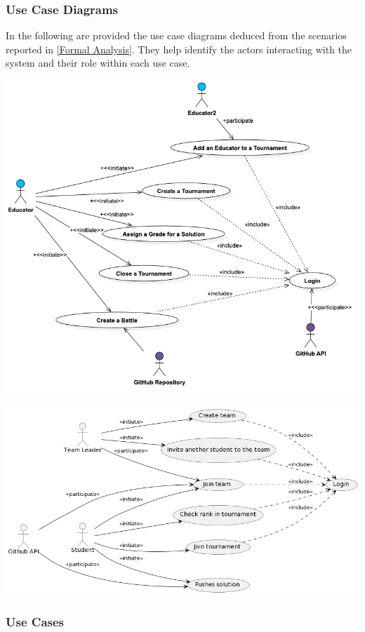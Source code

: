\documentclass{article}
\begin{document}
\subsubsection{Use Case Diagrams}
In the following are provided the use case diagrams deduced from the scenarios reported in \ref{Formal Analysis}. They help identify the actors interacting with the system and their role within each use case. 

\begin{center}
    \includegraphics[width=0.8\linewidth]{image9.png}
  \label{fig:usecaseeducator}
\end{center}

\begin{center}
    \includegraphics[width=0.9\linewidth]{image19.png}
  \label{fig:usecasestudent}
\end{center}
\newpage
\subsubsection{Use Cases}
\end{document}
